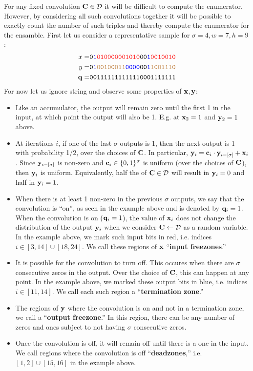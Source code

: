 For any fixed convolution $\mathbf{C}\in \mathcal{D}$ it will be difficult to compute the enumerator. However, by considering all such convolutions together it will be possible to exactly count the number of such triples and thereby compute the enumerator for the ensamble. First let us consider a representative sample for $\sigma=4,w=7,h=9$:
\begin{align*}
    x= & \texttt{0\textcolor{blue}{1}\textcolor{red}{010000001010}00\textcolor{blue}{1}\textcolor{red}{0010010}}\\
    y= & \texttt{0\textcolor{blue}{1}\textcolor{brown}{00100011}\textcolor{blue}{0000}00\textcolor{blue}{1}\textcolor{brown}{1001110}}\\
    \mathbf{q}= & \texttt{001111111111110001111111}
\end{align*}
For now let us ignore \qv string and observe some properties of $\mathbf{x},\mathbf{y}$:
\begin{itemize}
    \item Like an accumulator, the output will remain zero until the first 1 in the input, at which point the output will also be 1. E.g. at $\mathbf{x}_2=1$ and $\mathbf{y}_2=1$ above.
    \item At iterations $i$, if one of the last $\sigma$ outputs is 1, then the next output is 1 with probability 1/2, over the choices of $\mathbf{C}$. In particular,
    $\mathbf{y}_i=\mathbf{c}_i\cdot \mathbf{y}_{i-[\sigma]} + \mathbf{x}_i$. Since $\mathbf{y}_{i-[\sigma]}$ is non-zero and $\mathbf{c}_i\in\{0,1\}^\sigma$ is uniform (over the choices of $\mathbf{C}$), then $\mathbf{y}_i$ is uniform. Equivalently, half the of $\mathbf{C}\in \mathcal{D}$ will result in $\mathbf{y}_i=0$ and half in $\mathbf{y}_i=1$.
    \item When there is at least 1 non-zero in the previous $\sigma$ outputs, we say that the convolution is ``on'', as seen in the example above and is denoted by $\mathbf{q}_i=1$. When the convolution is on ($\mathbf{q}_i=1$), the value of $\mathbf{x}_i$ does not change the distribution of the output $\mathbf{y}_i$ when we consider $\mathbf{C}\gets \mathcal{D}$ as a random variable. In the example above, we mark such input bits in red, i.e. indices $i\in [3,14]\cup [18,24]$. We call these regions of $\mathbf{x}$ ``\textbf{input freezones}.''
    
    \item It is possible for the convolution to turn off. This occures when there are $\sigma$ consecutive zeros in the output. Over the choice of $\mathbf{C}$, this can happen at any point. In the example above, we marked these output bits in blue, i.e. indices $i\in [11,14]$. We call each such region a ``\textbf{termination zone}.''

    \item The regions of $\mathbf{y}$ where the convolution is on and not in a termination zone, we call a ``\textbf{output freezone}.'' In this region, there can be any number of zeros and ones subject to not having $\sigma$ consecutive zeros. 

    \item Once the convolution is off, it will remain off until there is a one in the input. We call regions where the convolution is off ``\textbf{deadzones},'' i.e. $[1,2]\cup[15,16]$ in the example above.
\end{itemize}

